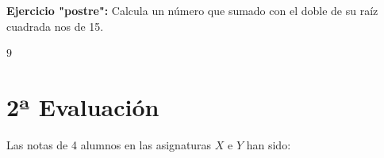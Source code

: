 \documentclass[addpoints,spanish, 12pt,a4paper]{exam}
\begin{document}
\begin{questions}
\begin{multicols}{1}
\begin{parts}
\end{parts}
\end{multicols}
        
        \question[1] \textbf{Ejercicio "postre":} Calcula un número que sumado con el doble de su raíz cuadrada nos de 15.
\addpoints %


\begin{solution}
 	$9$ 
\end{solution}
        


\section*{2ª Evaluación}

        
        \question[1] Las notas de 4 alumnos en las asignaturas $X$ e $Y$ han sido:
        

\end{questions}
\end{document}
